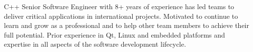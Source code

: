 

\begin{cvparagraph}

C++ Senior Software Engineer with 8+ years of experience has led teams to deliver critical applications in international projects. Motivated to continue to learn and grow as a professional and to help other team members to achieve their full potential. Prior experience in Qt, Linux and embedded platforms and expertise in all aspects of the software development lifecycle.
\end{cvparagraph}
